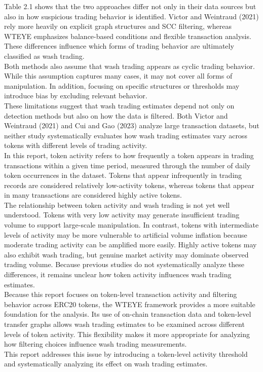 \documentclass[language=english,thesis=bachelor,nosecondtitle,faculty=cb,onesided,12pt]{hsmw-thesis}
\begin{document}
Table 2.1 shows that the two approaches differ not only in their data sources but also in how suspicious trading behavior is identified. Victor and Weintraud (2021) rely more heavily on explicit graph structures and SCC filtering, whereas WTEYE emphasizes balance-based conditions and flexible transaction analysis. These differences influence which forms of trading behavior are ultimately classified as wash trading.\\
Both methods also assume that wash trading appears as cyclic trading behavior. While this assumption captures many cases, it may not cover all forms of manipulation. In addition, focusing on specific structures or thresholds may introduce bias by excluding relevant behavior.\\
These limitations suggest that wash trading estimates depend not only on detection methods but also on how the data is filtered. Both Victor and Weintraud (2021) and Cui and Gao (2023) analyze large transaction datasets, but neither study systematically evaluates how wash trading estimates vary across tokens with different levels of trading activity.\\
In this report, token activity refers to how frequently a token appears in trading transactions within a given time period, measured through the number of daily token occurrences in the dataset. Tokens that appear infrequently in trading records are considered relatively low-activity tokens, whereas tokens that appear in many transactions are considered highly active tokens.\\
The relationship between token activity and wash trading is not yet well understood. Tokens with very low activity may generate insufficient trading volume to support large-scale manipulation. In contrast, tokens with intermediate levels of activity may be more vulnerable to artificial volume inflation because moderate trading activity can be amplified more easily. Highly active tokens may also exhibit wash trading, but genuine market activity may dominate observed trading volume. Because previous studies do not systematically analyze these differences, it remains unclear how token activity influences wash trading estimates.\\
Because this report focuses on token-level transaction activity and filtering behavior across ERC20 tokens, the WTEYE framework provides a more suitable foundation for the analysis. Its use of on-chain transaction data and token-level transfer graphs allows wash trading estimates to be examined across different levels of token activity. This flexibility makes it more appropriate for analyzing how filtering choices influence wash trading measurements.\\
This report addresses this issue by introducing a token-level activity threshold and systematically analyzing its effect on wash trading estimates.\\
\end{document}
